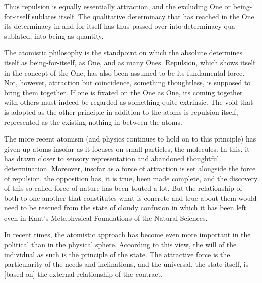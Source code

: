 Thus repulsion is equally essentially attraction, and
the excluding One or being-for-itself sublates itself.
The qualitative determinacy that has reached in the One
its determinacy in-and-for-itself
has thus passed over into determinacy qua sublated,
into being as quantity.

    The atomistic philosophy is the standpoint on which the absolute
    determines itself as being-for-itself, as One, and as many Ones.
    Repulsion, which shows itself in the concept of the One, has also
    been assumed to be its fundamental force.
    Not, however, attraction but coincidence, something thoughtless, is
    supposed to bring them together.
    If one is fixated on the One as One,
    its coming together with others must
    indeed be regarded as something quite extrinsic.
    The void that is adopted as the other principle
    in addition to the atoms is repulsion itself,
    represented as the existing nothing in between the atoms.

    The more recent atomism (and physics continues to hold on to this principle)
    has given up atoms insofar as it focuses on small particles, the molecules.
    In this, it has drawn closer to sensory representation and
    abandoned thoughtful determination.
    Moreover, insofar as a force of attraction is set alongside
    the force of repulsion, the opposition has, it is true,
    been made complete, and the discovery of this so-called
    force of nature has been touted a lot.
    But the relationship of both to one another that
    constitutes what is concrete and true about them would need to be
    rescued from the state of cloudy confusion in which it has been left
    even in Kant's Metaphysical Foundations of the Natural Sciences.

    In recent times, the atomistic approach has become even more important
    in the political than in the physical sphere.
    According to this view, the will of the individual as such is
    the principle of the state.
    The attractive force is the particularity of the needs and inclinations,
    and the universal, the state itself, is [based on]
    the external relationship of the contract.
